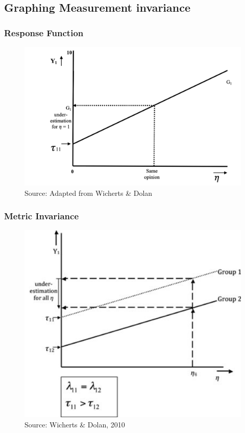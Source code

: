 \documentclass[
]{book}
\begin{document}
\hypertarget{graphing-measurement-invariance}{%
\subsection{Graphing Measurement invariance}\label{graphing-measurement-invariance}}

\hypertarget{response-function}{%
\subsubsection{Response Function}\label{response-function}}

\begin{figure}
\includegraphics[width=0.8\linewidth]{response_function} \caption{Source: Adapted from Wicherts & Dolan}\label{fig:response}
\end{figure}

\hypertarget{metric-invariance}{%
\subsubsection{Metric Invariance}\label{metric-invariance}}

\begin{figure}
\includegraphics[width=0.8\linewidth]{Picture1} \caption{Source: Wicherts & Dolan, 2010}\label{fig:metric}
\end{figure}
\end{document}
